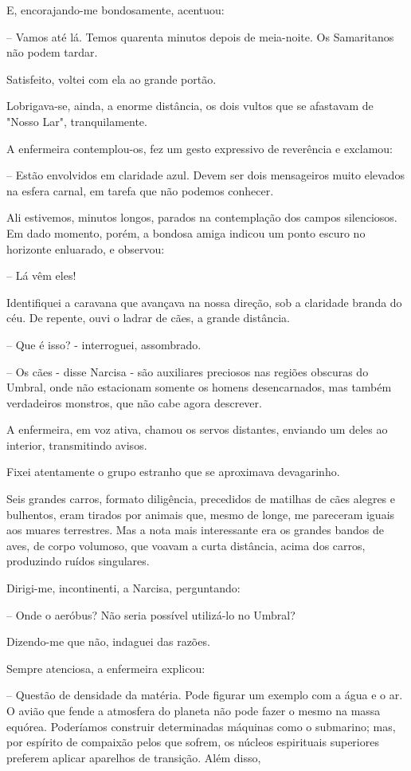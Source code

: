 \documentclass[portuguese,12pt,a4paper]{scrbook}
\begin{document}
	E, encorajando-me bondosamente, acentuou:
	
	– Vamos até lá. Temos quarenta minutos depois de meia-noite. Os Samaritanos não podem tardar.
	
	Satisfeito, voltei com ela ao grande portão.
	
	Lobrigava-se, ainda, a enorme distância, os dois vultos que se afastavam de "Nosso Lar", tranquilamente.
	
	A enfermeira contemplou-os, fez um gesto expressivo de reverência e exclamou:
	
	– Estão envolvidos em claridade azul. Devem ser dois mensageiros muito elevados na esfera carnal, em tarefa que não podemos conhecer.
	
	Ali estivemos, minutos longos, parados na contemplação dos campos silenciosos. Em dado momento, porém, a bondosa amiga indicou um ponto escuro no horizonte enluarado, e observou:
	
	
	– Lá vêm eles!
	
	Identifiquei a caravana que avançava na nossa direção, sob a claridade branda do céu. De repente, ouvi o ladrar de cães, a grande distância.
	
	– Que é isso? - interroguei, assombrado.
	
	– Os cães - disse Narcisa - são auxiliares preciosos nas regiões obscuras do Umbral, onde não estacionam somente os homens desencarnados, mas também verdadeiros monstros, que não cabe agora descrever.
	
	A enfermeira, em voz ativa, chamou os servos distantes, enviando um deles ao interior, transmitindo avisos.
	
	Fixei atentamente o grupo estranho que se aproximava devagarinho.
	
	Seis grandes carros, formato diligência, precedidos de matilhas de cães alegres e bulhentos, eram tirados por animais que, mesmo de longe, me pareceram iguais aos muares terrestres. Mas a nota mais interessante era os grandes bandos de aves, de corpo volumoso, que voavam a curta distância, acima dos carros, produzindo ruídos singulares.
	
	Dirigi-me, incontinenti, a Narcisa, perguntando:
	
	– Onde o aeróbus? Não seria possível utilizá-lo no Umbral?
	
	Dizendo-me que não, indaguei das razões.
	
	Sempre atenciosa, a enfermeira explicou:
	
	– Questão de densidade da matéria. Pode figurar um exemplo com a água e o ar. O avião que fende a atmosfera do planeta não pode fazer o mesmo na massa equórea. Poderíamos construir determinadas máquinas como o submarino; mas, por espírito de compaixão pelos que sofrem, os núcleos espirituais superiores preferem aplicar aparelhos de transição. Além disso,
	
\end{document}
